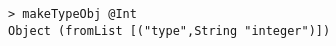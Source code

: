 \begin{repl}\begin{lstlisting}
> makeTypeObj @Int
Object (fromList [("type",String "integer")])\end{lstlisting}\end{repl}
